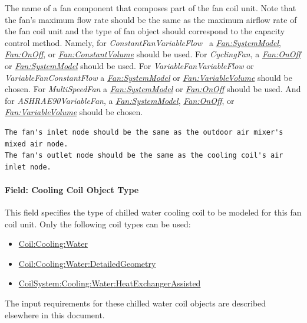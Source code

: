 The name of a fan component that composes part of the fan coil unit. Note that the fan's maximum flow rate should be the same as the maximum airflow rate of the fan coil unit and the type of fan object should correspond to the capacity control method. Namely, for \emph{ConstantFanVariableFlow~} a \emph{\hyperref[fansystemmodel]{Fan:SystemModel}}, \emph{\hyperref[fanonoff]{Fan:OnOff}}, or \emph{\hyperref[fanconstantvolume]{Fan:ConstantVolume}} should be used. For \emph{CyclingFan}, a \emph{\hyperref[fanonoff]{Fan:OnOff}} or \emph{\hyperref[fansystemmodel]{Fan:SystemModel}} should be used. For \emph{VariableFanVariableFlow} or \emph{VariableFanConstantFlow} a \emph{\hyperref[fansystemmodel]{Fan:SystemModel}} or \emph{\hyperref[fanvariablevolume]{Fan:VariableVolume}} should be chosen. For \emph{MultiSpeedFan} a \emph{\hyperref[fansystemmodel]{Fan:SystemModel}} or \emph{\hyperref[fanonoff]{Fan:OnOff}} should be used. And for \emph{ASHRAE90VariableFan}, a \emph{\hyperref[fansystemmodel]{Fan:SystemModel}}, \emph{\hyperref[fanonoff]{Fan:OnOff}}, or \emph{\hyperref[fanvariablevolume]{Fan:VariableVolume}} should be chosen.

\begin{lstlisting}
The fan's inlet node should be the same as the outdoor air mixer's mixed air node.
The fan's outlet node should be the same as the cooling coil's air inlet node.
\end{lstlisting}

\paragraph{Field: Cooling Coil Object Type}\label{field-cooling-coil-object-type-003}

This field specifies the type of chilled water cooling coil to be modeled for this fan coil unit. Only the following coil types can be used:

\begin{itemize}
\item
  \hyperref[coilcoolingwater]{Coil:Cooling:Water}
\item
  \hyperref[coilcoolingwaterdetailedgeometry]{Coil:Cooling:Water:DetailedGeometry}
\item
  \hyperref[coilsystemcoolingwaterheatexchangerassisted]{CoilSystem:Cooling:Water:HeatExchangerAssisted}
\end{itemize}

The input requirements for these chilled water coil objects are described elsewhere in this document.

